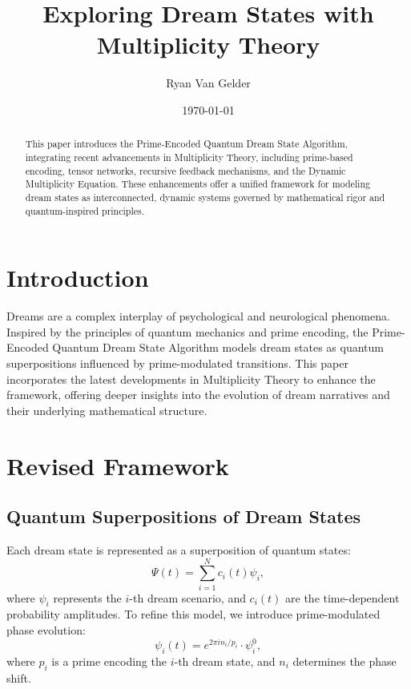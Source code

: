 \documentclass{article}
\theoremstyle{plain}
\begin{document}
\title{Exploring Dream States with Multiplicity Theory}

\author{Ryan Van Gelder}
\date{\today}
\maketitle

\begin{abstract}
This paper introduces the Prime-Encoded Quantum Dream State Algorithm, integrating recent advancements in Multiplicity Theory, including prime-based encoding, tensor networks, recursive feedback mechanisms, and the Dynamic Multiplicity Equation. These enhancements offer a unified framework for modeling dream states as interconnected, dynamic systems governed by mathematical rigor and quantum-inspired principles.
\end{abstract}

\section{Introduction}
Dreams are a complex interplay of psychological and neurological phenomena. Inspired by the principles of quantum mechanics and prime encoding, the Prime-Encoded Quantum Dream State Algorithm models dream states as quantum superpositions influenced by prime-modulated transitions. This paper incorporates the latest developments in Multiplicity Theory to enhance the framework, offering deeper insights into the evolution of dream narratives and their underlying mathematical structure.

\section{Revised Framework}
\subsection{Quantum Superpositions of Dream States}
Each dream state is represented as a superposition of quantum states:
\begin{equation}
\Psi(t) = \sum_{i=1}^N c_i(t) \psi_i,
\end{equation}
where $\psi_i$ represents the $i$-th dream scenario, and $c_i(t)$ are the time-dependent probability amplitudes. To refine this model, we introduce prime-modulated phase evolution:
\begin{equation}
\psi_i(t) = e^{2\pi i n_i/p_i} \cdot \psi_i^0,
\end{equation}
where $p_i$ is a prime encoding the $i$-th dream state, and $n_i$ determines the phase shift.
\end{document}
